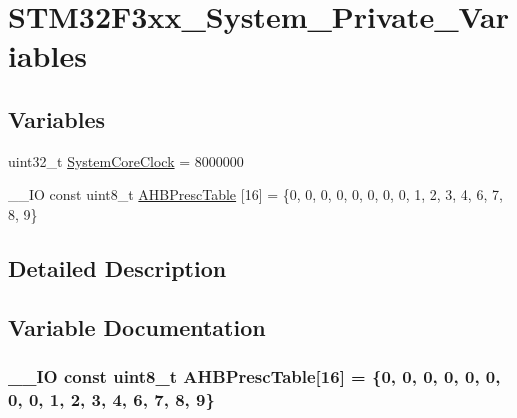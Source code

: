 \hypertarget{group___s_t_m32_f3xx___system___private___variables}{}\section{S\+T\+M32\+F3xx\+\_\+\+System\+\_\+\+Private\+\_\+\+Variables}
\label{group___s_t_m32_f3xx___system___private___variables}
\subsection*{Variables}
\begin{DoxyCompactItemize}
\item 
uint32\+\_\+t \hyperlink{group___s_t_m32_f3xx___system___private___variables_gaa3cd3e43291e81e795d642b79b6088e6}{System\+Core\+Clock} = 8000000
\item 
\+\_\+\+\_\+\+I\+O const uint8\+\_\+t \hyperlink{group___s_t_m32_f3xx___system___private___variables_ga6f9c3580a063d25bfc3acae1db341b12}{A\+H\+B\+Presc\+Table} \mbox{[}16\mbox{]} = \{0, 0, 0, 0, 0, 0, 0, 0, 1, 2, 3, 4, 6, 7, 8, 9\}
\end{DoxyCompactItemize}


\subsection{Detailed Description}


\subsection{Variable Documentation}
\hypertarget{group___s_t_m32_f3xx___system___private___variables_ga6f9c3580a063d25bfc3acae1db341b12}{}
\subsubsection[{A\+H\+B\+Presc\+Table}]{\setlength{\rightskip}{0pt plus 5cm}\+\_\+\+\_\+\+I\+O const uint8\+\_\+t A\+H\+B\+Presc\+Table\mbox{[}16\mbox{]} = \{0, 0, 0, 0, 0, 0, 0, 0, 1, 2, 3, 4, 6, 7, 8, 9\}}\label{group___s_t_m32_f3xx___system___private___variables_ga6f9c3580a063d25bfc3acae1db341b12}


